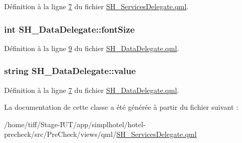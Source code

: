 Définition à la ligne \hyperlink{SH__ServicesDelegate_8qml_source_l00007}{7} du fichier \hyperlink{SH__ServicesDelegate_8qml_source}{S\-H\-\_\-\-Services\-Delegate.\-qml}.

\hypertarget{classSH__DataDelegate_afbb41ad9b513c7f27e7b5ad90d82e95b}{
\subsubsection[{font\-Size}]{\setlength{\rightskip}{0pt plus 5cm}int S\-H\-\_\-\-Data\-Delegate\-::font\-Size\hspace{0.3cm}{\ttfamily [inherited]}}}\label{classSH__DataDelegate_afbb41ad9b513c7f27e7b5ad90d82e95b}


Définition à la ligne \hyperlink{SH__DataDelegate_8qml_source_l00009}{9} du fichier \hyperlink{SH__DataDelegate_8qml_source}{S\-H\-\_\-\-Data\-Delegate.\-qml}.

\hypertarget{classSH__DataDelegate_acb9da3c73493c88865e08d9575f26482}{
\subsubsection[{value}]{\setlength{\rightskip}{0pt plus 5cm}string S\-H\-\_\-\-Data\-Delegate\-::value\hspace{0.3cm}{\ttfamily [inherited]}}}\label{classSH__DataDelegate_acb9da3c73493c88865e08d9575f26482}


Définition à la ligne \hyperlink{SH__DataDelegate_8qml_source_l00007}{7} du fichier \hyperlink{SH__DataDelegate_8qml_source}{S\-H\-\_\-\-Data\-Delegate.\-qml}.



La documentation de cette classe a été générée à partir du fichier suivant \-:\begin{DoxyCompactItemize}
\item 
/home/tiff/\-Stage-\/\-I\-U\-T/app/simplhotel/hotel-\/precheck/src/\-Pre\-Check/views/qml/\hyperlink{SH__ServicesDelegate_8qml}{S\-H\-\_\-\-Services\-Delegate.\-qml}\end{DoxyCompactItemize}
